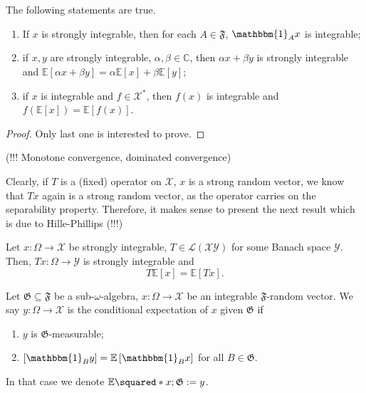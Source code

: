 \begin{lem}
    The following statements are true.
    \begin{enumerate}[1)]
      \item If \( x \) is strongly integrable, then for each \( A \in \mathfrak{F} \), \( \mathbbm{1}_{A}x \) is integrable;
      \item if \( x,y \) are strongly integrable, \( \alpha,\beta \in \mathbb{C} \), then \( \alpha x + \beta y \) is strongly integrable and \( \mathbb{E}\left[\alpha x + \beta y\right]= \alpha \mathbb{E}\left[x\right]+ \beta \mathbb{E}\left[y\right] \);
      \item if \( x \) is integrable and \( f \in \mathcal{X}^{*} \), then \( f(x) \) is integrable and \( f\left(\mathbb{E}\left[x\right]\right)= \mathbb{E}\left[f(x)\right] \).
    \end{enumerate}
    
\end{lem}

\begin{proof}
    Only last one is interested to prove.
\end{proof}


\begin{thm}
  (!!! Monotone convergence, dominated convergence)
\end{thm}



Clearly, if \( T \) is a (fixed) operator on \( \mathcal{X} \), \( x \) is a strong random vector, we know that \( Tx \) again is a strong random vector, as the operator carries on the separability property. Therefore, it makes sense to present the next result which is due to Hille-Phillips (!!!)

\begin{lem}
    Let \( x: \Omega \to \mathcal{X} \) be strongly integrable, \( T \in \mathcal{L}(\mathcal{X}\mathcal{Y}) \) for some Banach space \( \mathcal{Y} \). Then, \( Tx: \Omega \to \mathcal{Y} \) is strongly integrable and 
    \[ T \mathbb{E}\left[x\right]= \mathbb{E}\left[Tx\right]. \]
\end{lem}


\begin{defn}
    Let \( \mathfrak{G} \subseteq \mathfrak{F} \) be a sub-\(\omega  \)-algebra, \( x: \Omega \to \mathcal{X} \) be an integrable \( \mathfrak{F} \)-random vector. We say \( y: \Omega \to \mathcal{X} \)  is the conditional expectation of \( x \) given \( \mathfrak{G} \) if  
    \begin{enumerate}[1)]
      \item \( y \) is \( \mathfrak{G} \)-measurable;
      \item \( \left[\mathbbm{1}_By\right]= \mathbb{E}\left[\mathbbm{1}_Bx\right] \) for all \( B \in \mathfrak{G} \).
    \end{enumerate}
    In that case we denote \( \mathbb{E}\squared*{x;\mathfrak{G}}:= y \).
\end{defn}


